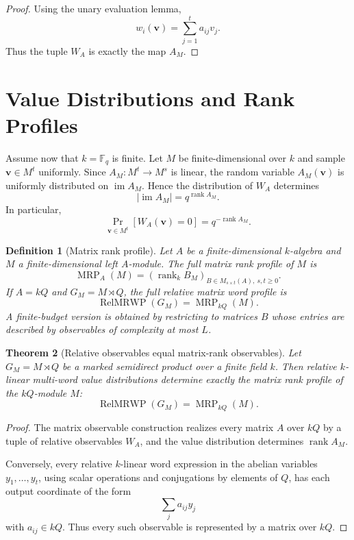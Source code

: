 \documentclass[11pt]{article}
\newtheorem{theorem}{Theorem}[section]
\newtheorem{definition}[theorem]{Definition}
\begin{document}
\begin{proof}
Using the unary evaluation lemma,
\[
w_i(\mathbf v)=\sum_{j=1}^t a_{ij}v_j.
\]
Thus the tuple $W_A$ is exactly the map $A_M$.
\end{proof}

\section{Value Distributions and Rank Profiles}

Assume now that $k=\mathbb F_q$ is finite. Let $M$ be finite-dimensional over $k$ and sample $\mathbf v\in M^t$ uniformly. Since $A_M:M^t\to M^s$ is linear, the random variable $A_M(\mathbf v)$ is uniformly distributed on $\operatorname{im}A_M$. Hence the distribution of $W_A$ determines
\[
|\operatorname{im}A_M|=q^{\operatorname{rank}A_M}.
\]
In particular,
\[
\Pr_{\mathbf v\in M^t}[W_A(\mathbf v)=0]
=q^{-\operatorname{rank}A_M}.
\]

\begin{definition}[Matrix rank profile]
Let $A$ be a finite-dimensional $k$-algebra and $M$ a finite-dimensional left $A$-module. The full matrix rank profile of $M$ is
\[
\operatorname{MRP}_A(M)
=
\left(
\operatorname{rank}_k B_M
\right)_{B\in M_{s\times t}(A),\ s,t\ge0}.
\]
If $A=kQ$ and $G_M=M\rtimes Q$, the full relative matrix word profile is
\[
\operatorname{RelMRWP}(G_M)=\operatorname{MRP}_{kQ}(M).
\]
A finite-budget version is obtained by restricting to matrices $B$ whose entries are described by observables of complexity at most $L$.
\end{definition}

\begin{theorem}[Relative observables equal matrix-rank observables]
Let $G_M=M\rtimes Q$ be a marked semidirect product over a finite field $k$. Then relative $k$-linear multi-word value distributions determine exactly the matrix rank profile of the $kQ$-module $M$:
\[
\operatorname{RelMRWP}(G_M)=\operatorname{MRP}_{kQ}(M).
\]
\end{theorem}

\begin{proof}
The matrix observable construction realizes every matrix $A$ over $kQ$ by a tuple of relative observables $W_A$, and the value distribution determines $\operatorname{rank}A_M$.

Conversely, every relative $k$-linear word expression in the abelian variables $y_1,\ldots,y_t$, using scalar operations and conjugations by elements of $Q$, has each output coordinate of the form
\[
\sum_j a_{ij}y_j
\]
with $a_{ij}\in kQ$. Thus every such observable is represented by a matrix over $kQ$.
\end{proof}
\end{document}
